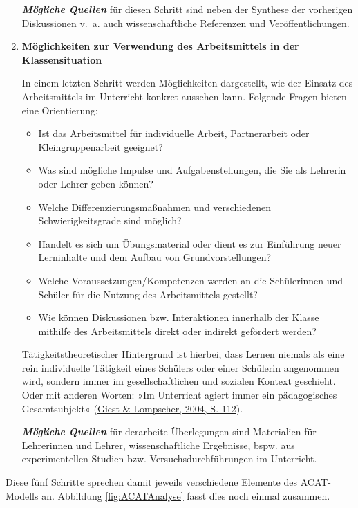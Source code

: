 \documentclass[
]{scrbook}
\providecommand{\tightlist}{%
  \setlength{\itemsep}{0pt}\setlength{\parskip}{0pt}}
\theoremstyle{definition}
\theoremstyle{definition}
\theoremstyle{definition}
\theoremstyle{definition}
\theoremstyle{remark}
\begin{document}
\begin{enumerate}
  \textbf{\emph{Mögliche Quellen}} für diesen Schritt sind neben der Synthese der vorherigen Diskussionen v.~a. auch wissenschaftliche Referenzen und Veröffentlichungen.
\item
  \textbf{Möglichkeiten zur Verwendung des Arbeitsmittels in der Klassensituation }

  In einem letzten Schritt werden Möglichkeiten dargestellt, wie der Einsatz des Arbeitsmittels im Unterricht konkret aussehen kann. Folgende Fragen bieten eine Orientierung:

  \begin{itemize}
  \tightlist
  \item
    Ist das Arbeitsmittel für individuelle Arbeit, Partnerarbeit oder Kleingruppenarbeit geeignet?
  \item
    Was sind mögliche Impulse und Aufgabenstellungen, die Sie als Lehrerin oder Lehrer geben können?
  \item
    Welche Differenzierungsmaßnahmen und verschiedenen Schwierigkeitsgrade sind möglich?
  \item
    Handelt es sich um Übungsmaterial oder dient es zur Einführung neuer Lerninhalte und dem Aufbau von Grundvorstellungen?
  \item
    Welche Voraussetzungen/Kompetenzen werden an die Schülerinnen und Schüler für die Nutzung des Arbeitsmittels gestellt?
  \item
    Wie können Diskussionen bzw. Interaktionen innerhalb der Klasse mithilfe des Arbeitsmittels direkt oder indirekt gefördert werden?
  \end{itemize}

  Tätigkeitstheoretischer Hintergrund ist hierbei, dass Lernen niemals als eine rein individuelle Tätigkeit eines Schülers oder einer Schülerin angenommen wird, sondern immer im gesellschaftlichen und sozialen Kontext geschieht. Oder mit anderen Worten: »Im Unterricht agiert immer ein pädagogisches Gesamtsubjekt« (\protect\hyperlink{ref-Giest2004a}{Giest \& Lompscher, 2004, S. 112}).

  \textbf{\emph{Mögliche Quellen}} für derarbeite Überlegungen sind Materialien für Lehrerinnen und Lehrer, wissenschaftliche Ergebnisse, bspw. aus experimentellen Studien bzw. Versuchsdurchführungen im Unterricht.
\end{enumerate}

Diese fünf Schritte sprechen damit jeweils verschiedene Elemente des ACAT-Modells an. Abbildung \ref{fig:ACATAnalyse} fasst dies noch einmal zusammen.
\end{document}
